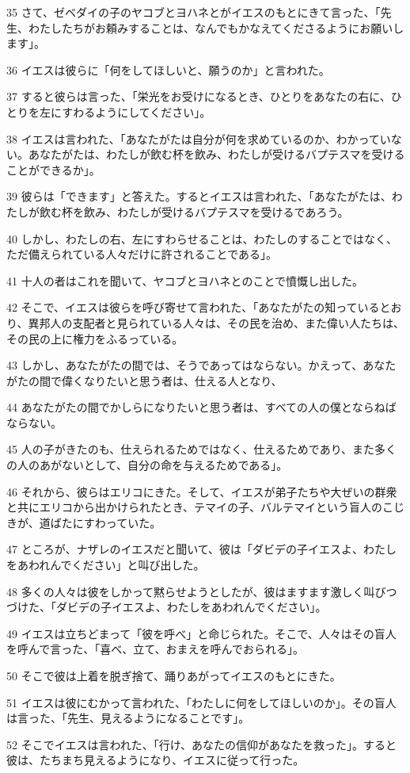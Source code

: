 \par 35 さて、ゼベダイの子のヤコブとヨハネとがイエスのもとにきて言った、「先生、わたしたちがお頼みすることは、なんでもかなえてくださるようにお願いします」。
\par 36 イエスは彼らに「何をしてほしいと、願うのか」と言われた。
\par 37 すると彼らは言った、「栄光をお受けになるとき、ひとりをあなたの右に、ひとりを左にすわるようにしてください」。
\par 38 イエスは言われた、「あなたがたは自分が何を求めているのか、わかっていない。あなたがたは、わたしが飲む杯を飲み、わたしが受けるバプテスマを受けることができるか」。
\par 39 彼らは「できます」と答えた。するとイエスは言われた、「あなたがたは、わたしが飲む杯を飲み、わたしが受けるバプテスマを受けるであろう。
\par 40 しかし、わたしの右、左にすわらせることは、わたしのすることではなく、ただ備えられている人々だけに許されることである」。
\par 41 十人の者はこれを聞いて、ヤコブとヨハネとのことで憤慨し出した。
\par 42 そこで、イエスは彼らを呼び寄せて言われた、「あなたがたの知っているとおり、異邦人の支配者と見られている人々は、その民を治め、また偉い人たちは、その民の上に権力をふるっている。
\par 43 しかし、あなたがたの間では、そうであってはならない。かえって、あなたがたの間で偉くなりたいと思う者は、仕える人となり、
\par 44 あなたがたの間でかしらになりたいと思う者は、すべての人の僕とならねばならない。
\par 45 人の子がきたのも、仕えられるためではなく、仕えるためであり、また多くの人のあがないとして、自分の命を与えるためである」。
\par 46 それから、彼らはエリコにきた。そして、イエスが弟子たちや大ぜいの群衆と共にエリコから出かけられたとき、テマイの子、バルテマイという盲人のこじきが、道ばたにすわっていた。
\par 47 ところが、ナザレのイエスだと聞いて、彼は「ダビデの子イエスよ、わたしをあわれんでください」と叫び出した。
\par 48 多くの人々は彼をしかって黙らせようとしたが、彼はますます激しく叫びつづけた、「ダビデの子イエスよ、わたしをあわれんでください」。
\par 49 イエスは立ちどまって「彼を呼べ」と命じられた。そこで、人々はその盲人を呼んで言った、「喜べ、立て、おまえを呼んでおられる」。
\par 50 そこで彼は上着を脱ぎ捨て、踊りあがってイエスのもとにきた。
\par 51 イエスは彼にむかって言われた、「わたしに何をしてほしいのか」。その盲人は言った、「先生、見えるようになることです」。
\par 52 そこでイエスは言われた、「行け、あなたの信仰があなたを救った」。すると彼は、たちまち見えるようになり、イエスに従って行った。

